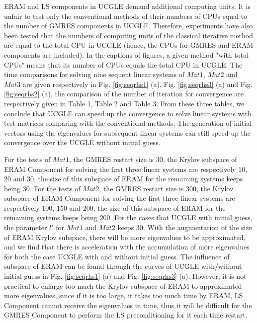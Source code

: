 ERAM and LS components in UCGLE demand additional computing units. It is unfair to test only the conventional methods of their numbers of CPUs equal to the number of GMRES components in UCGLE. Therefore, experiments have also been tested that the numbers of computing units of the classical iterative method are equal to the total CPU in UCGLE (hence, the CPUs for GMRES and ERAM components are included). In the captions of figures, a given method "with total CPUs" means that its number of CPUs equals the total CPU in UCGLE. The time comparisons for solving nine sequent linear systems of $Mat1$, $Mat2$ and $Mat3$ are given respectively in Fig. \ref{fig:seqrhs1} (a), Fig. \ref{fig:seqrhs3} (a) and Fig. \ref{fig:seqrhs2} (a), the comparison of the number of iteration for convergence are respectively given in Table 1, Table 2 and Table 3. From these three tables, we conclude that UCGLE can speed up the convergence to solve linear systems with test matrices comparing with the conventional methods. The generation of initial vectors using the eigenvalues for subsequent linear systems can still speed up the convergence over the UCGLE without initial guess.

For the tests of $Mat1$, the GMRES restart size is $30$, the Krylov subspace of ERAM Component for solving the first three linear systems are respectively $10$, $20$ and $30$, the size of this subspace of ERAM for the remaining systems keeps being $30$. For the tests of $Mat2$, the GMRES restart size is $300$, the Krylov subspace of ERAM Component for solving the first three linear systems are respectively $100$, $150$ and $200$, the size of this subspace of ERAM for the remaining systems keeps being $200$. For the cases that UCGLE with initial guess, the parameter $l'$ for $Mat1$ and $Mat2$ keeps $30$. With the augmentation of the size of ERAM Krylov subspace, there will be more eigenvalues to be approximated, and we find that there is acceleration with the accumulation of more eigenvalues for both the case UCGLE with and without initial guess. The influence of subspace of ERAM can be found through the curves of UCGLE with/without initial guess in Fig. \ref{fig:seqrhs1} (a) and Fig. \ref{fig:seqrhs3} (a). However, it is not practical to enlarge too much the Krylov subspace of ERAM to approximated more eigenvalues, since if it is too large, it takes too much time by ERAM, LS Component cannot receive the eigenvalues in time, thus it will be difficult for the GMRES Component to perform the LS preconditioning for it each time restart.

